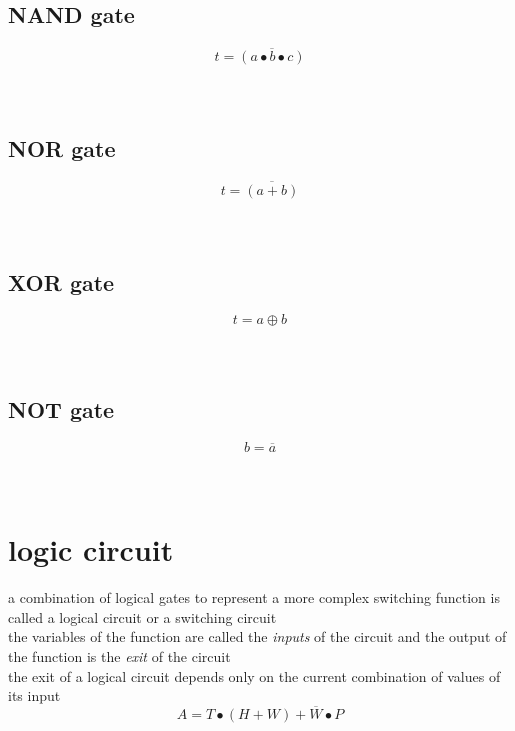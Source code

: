 \documentclass[a4paper,12pt]{article}
\begin{document}
\subsection{NAND gate}
\label{sec:orgd71d708}
\[
  t = \overline{(a \bullet b \bullet c)}
\]\\
\\

\subsection{NOR gate}
\label{sec:orgcd29f6d}
\[
  t = \overline{(a + b)}
\]\\
\\

\subsection{XOR gate}
\label{sec:org414bbfd}
\[
  t = a \oplus b
\]\\
\\

\subsection{NOT gate}
\label{sec:org9d9f716}
\[
  b = \overline{a}
\]\\
\\

\section{logic circuit}
\label{sec:org1b137e5}
a combination of logical gates to represent a more complex switching function is called a logical circuit or a switching circuit\\

the variables of the function are called the \emph{inputs} of the circuit and the output of the function is the \emph{exit} of the circuit\\

the exit of a logical circuit depends only on the current combination of values of its input\\

\[
  A = T \bullet (H + W) + \overline{W} \bullet P
\]\\

\\
\end{document}
